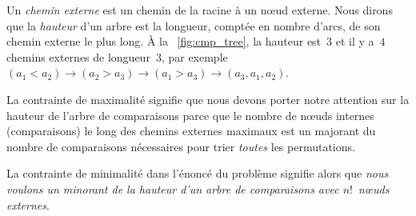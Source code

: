 Un \emph{chemin externe} est un
chemin de la racine à un nœud externe. Nous dirons que la
\emph{hauteur} d'un arbre est la
longueur, comptée en nombre d'arcs, de son chemin externe le plus
long. À la \fig~\ref{fig:cmp_tree}, la hauteur est~\(3\) et il y
a~\(4\) chemins externes de longueur~\(3\), par exemple \((a_1 < a_2)
\rightarrow (a_2 > a_3) \rightarrow (a_1 > a_3) \rightarrow
(a_3,a_1,a_2)\).

La contrainte de maximalité signifie que nous devons porter notre
attention sur la hauteur de l'arbre de comparaisons parce que le
nombre de nœuds internes (comparaisons) le long des chemins
externes maximaux est un majorant du nombre de comparaisons
nécessaires pour trier \emph{toutes} les
permutations.

La contrainte de minimalité dans l'énoncé du problème signifie alors
que \emph{nous voulons un minorant de la hauteur d'un arbre de
  comparaisons avec \(n!\)~nœuds externes}.

